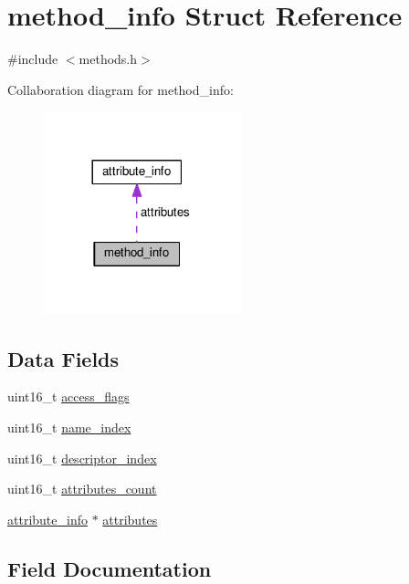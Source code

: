 \hypertarget{structmethod__info}{}\section{method\+\_\+info Struct Reference}
\label{structmethod__info}


{\ttfamily \#include $<$methods.\+h$>$}



Collaboration diagram for method\+\_\+info\+:\nopagebreak
\begin{figure}[H]
\begin{center}
\leavevmode
\includegraphics[width=161pt]{structmethod__info__coll__graph}
\end{center}
\end{figure}
\subsection*{Data Fields}
\begin{DoxyCompactItemize}
\item 
uint16\+\_\+t \hyperlink{structmethod__info_a8fc68aba419f2617deda879c467f5410}{access\+\_\+flags}
\item 
uint16\+\_\+t \hyperlink{structmethod__info_af0ba3d6d566432e74eed5c37cd998c14}{name\+\_\+index}
\item 
uint16\+\_\+t \hyperlink{structmethod__info_abccd6a5202d4c0ee1be6b89692d0352a}{descriptor\+\_\+index}
\item 
uint16\+\_\+t \hyperlink{structmethod__info_a9e711e4dfb8181f7dce16c6f640ba734}{attributes\+\_\+count}
\item 
\hyperlink{structattribute__info}{attribute\+\_\+info} $\ast$ \hyperlink{structmethod__info_a8ce4caaa03680c91f548558a38647ad8}{attributes}
\end{DoxyCompactItemize}


\subsection{Field Documentation}
